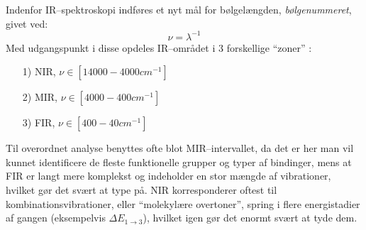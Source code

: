     Indenfor IR--spektroskopi indføres et nyt mål for bølgelængden, \textit{bølgenummeret}, givet ved:
    \[
        \nu=\lambda^{-1}
    \]
    Med udgangspunkt i disse opdeles IR--området i 3 forskellige ``zoner'' \parencite{Shah2018}:
    \begin{itemize}
        \item[1)] NIR, $\nu \in \left[14000-4000\si{cm^{-1}}\right]$
        \item[2)] MIR, $\nu \in \left[4000-400\si{cm^{-1}}\right]$
        \item[3)] FIR, $\nu \in \left[400-40\si{cm^{-1}}\right]$
    \end{itemize}
    Til overordnet analyse benyttes ofte blot MIR--intervallet, da det er her man vil kunnet identificere de fleste funktionelle grupper og typer af bindinger, mens at FIR er langt mere komplekst og indeholder en stor mængde af vibrationer, hvilket gør det svært at type på. NIR korresponderer oftest til kombinationsvibrationer, eller ``molekylære overtoner'', spring i flere energistadier af gangen (eksempelvis $\Delta E_{1\rightarrow 3}$), hvilket igen gør det enormt svært at tyde dem.


